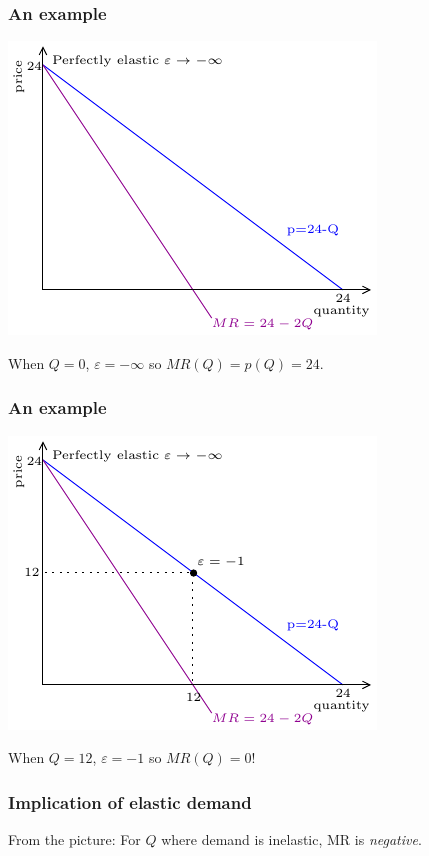 \documentclass[xcolor=pdftex,dvipsnames]{beamer}
\begin{document}
\begin{frame}
  \frametitle{An example}
  \begin{center}
    \includegraphics{pics/MRExample1}
  \end{center}
When $Q=0$,  $\varepsilon = -\infty$ so $MR(Q) = p(Q) = 24$.
\end{frame}
\begin{frame}
  \frametitle{An example}
  \begin{center}
    \includegraphics{pics/MRExample2}
  \end{center}
When $Q=12$,   $\varepsilon = -1$ so $MR(Q) = 0$!
\end{frame}

\begin{frame}
  \frametitle{Implication of elastic demand}
From the picture: For $Q$ where demand is inelastic, MR is
\emph{negative}.
\bigskip


\bigskip


\bigskip
{}
\end{frame}
\end{document}
